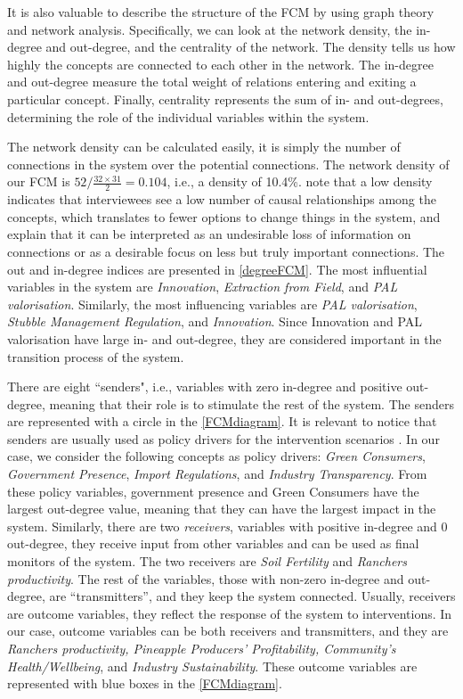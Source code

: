 It is also valuable to describe the structure of the FCM by using graph theory and network analysis. Specifically, we can look at the network density, the in-degree and out-degree, and the centrality of the network. The density tells us how highly the concepts are connected to each other in the network. The in-degree and out-degree measure the total weight of relations entering and exiting a particular concept. Finally, centrality represents the sum of in- and out-degrees, determining the role of the individual variables within the system.

The network density can be calculated easily, it is simply the number of connections in the system over the potential connections. The network density of our FCM is $52/\frac{32\times31}{2}=0.104$, i.e.,  a density of 10.4\%. \cite{ozesmi2004ecological} note that a low density indicates that interviewees see a low number of causal relationships among the concepts, which translates to fewer options to change things in the system, and \cite{jetter2014fuzzy} explain that it can be interpreted as an undesirable loss of information on connections or as a desirable focus on less but truly important connections. The out and in-degree indices are presented in \cref{degreeFCM}. The most influential variables in the system are \textit{Innovation}, \textit{Extraction from Field}, and \textit{PAL valorisation}. Similarly, the most influencing variables are \textit{PAL valorisation}, \textit{Stubble Management Regulation}, and \textit{Innovation}. Since Innovation and PAL valorisation have large in- and out-degree, they are considered important in the transition process of the system.  

There are eight ``senders", i.e., variables with zero in-degree and positive out-degree, meaning that their role is to stimulate the rest of the system. The senders are represented with a circle in the \cref{FCMdiagram}. It is relevant to notice that senders are usually used as policy drivers for the intervention scenarios \citep{morone2021using}.  In our case, we consider the following concepts as policy drivers: \textit{Green Consumers}, \textit{Government Presence}, \textit{Import Regulations}, and \textit{Industry Transparency}. From these policy variables, government presence and Green Consumers have the largest out-degree value, meaning that they can have the largest impact in the system. Similarly, there are two \textit{receivers}, variables with positive in-degree and 0 out-degree, they receive input from other variables and can be used as final monitors of the system. The two receivers are \textit{Soil Fertility} and \textit{Ranchers productivity}. The rest of the variables, those with non-zero in-degree and out-degree, are “transmitters”, and they keep the system connected. Usually, receivers are outcome variables, they reflect the response of the system to interventions. In our case, outcome variables can be both receivers and transmitters, and they are \textit{Ranchers productivity, Pineapple Producers' Profitability, Community's Health/Wellbeing}, and \textit{Industry Sustainability}. These outcome variables are represented with blue boxes in the \cref{FCMdiagram}.


